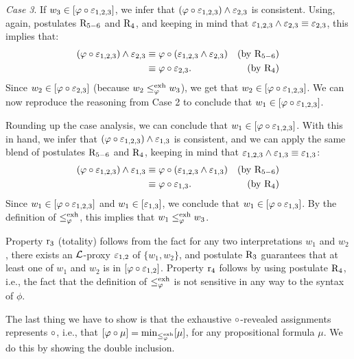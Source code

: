 \begin{prf*}{}{}
	\emph{Case 3}. If $w_3\in[\varphi\circ\varepsilon_{1,2,3}]$,
	we infer that $(\varphi\circ\varepsilon_{1,2,3})\land\varepsilon_{2,3}$ is consistent.	
	Using, again, postulates $\mathrm{R}_{5-6}$ and $\mathrm{R}_{4}$,
	and keeping in mind that $\varepsilon_{1,2,3}\land\varepsilon_{2,3}\equiv\varepsilon_{2,3}$,
	this implies that:
	\begin{align*}
		(\varphi\circ\varepsilon_{1,2,3})\land\varepsilon_{2,3} &\equiv\varphi\circ(\varepsilon_{1,2,3}\land\varepsilon_{2,3}) &(\text{by}~\mathrm{R}_{5-6})\\
		 										     &\equiv\varphi\circ\varepsilon_{2,3}. 		                 &(\text{by}~\mathrm{R}_{4})
	\end{align*}
	Since $w_2\in[\varphi\circ\varepsilon_{2,3}]$ (because $w_2\le^{\operatorname{exh}}_\varphi w_3$),
	we get that $w_2\in[\varphi\circ\varepsilon_{1,2,3}]$.
	We can now reproduce the reasoning from Case 2 to conclude that $w_1\in[\varphi\circ\varepsilon_{1,2,3}]$.
	
	Rounding up the case analysis, we can conclude that $w_1\in[\varphi\circ\varepsilon_{1,2,3}]$.
	With this in hand, we infer that $(\varphi\circ\varepsilon_{1,2,3})\land\varepsilon_{1,3}$ is consistent, 
	and we can apply the same blend of postulates $\mathrm{R}_{5-6}$ and $\mathrm{R}_{4}$,
	keeping in mind that $\varepsilon_{1,2,3}\land\varepsilon_{1,3}\equiv\varepsilon_{1,3}$:
	\begin{align*}
		(\varphi\circ\varepsilon_{1,2,3})\land\varepsilon_{1,3} &\equiv\varphi\circ(\varepsilon_{1,2,3}\land\varepsilon_{1,3}) &(\text{by}~\mathrm{R}_{5-6})\\
		 										     &\equiv\varphi\circ\varepsilon_{1,3}. 		                 &(\text{by}~\mathrm{R}_{4})
	\end{align*}
	Since $w_1\in[\varphi\circ\varepsilon_{1,2,3}]$ and $w_1\in[\varepsilon_{1,3}]$,
	we conclude that $w_1\in[\varphi\circ\varepsilon_{1,3}]$.
	By the definition of $\le^{\operatorname{exh}}_\varphi$, this implies that $w_1\le^{\operatorname{exh}}_\varphi w_3$.
	
	Property $\mathrm{r}_{3}$ (totality) follows from the fact for any two interpretations $w_1$ and $w_2$,
	there exists an $\mathcal{L}$-proxy $\varepsilon_{1,2}$ of $\{w_1,w_2\}$,
	and postulate $\mathrm{R}_{3}$ guarantees that at least one of $w_1$ and $w_2$ is in $[\varphi\circ\varepsilon_{1,2}]$.
	Property $\mathrm{r}_{4}$ follows by using postulate $\mathrm{R}_{4}$, i.e., 
	the fact that the definition of $\le^{{\operatorname{exh}}}_\varphi$ 
	is not sensitive in any way to the syntax of $\phi$.
	
	The last thing we have to show is that 
	the exhaustive $\circ$-revealed assignments represents $\circ$,
	i.e., that $[\varphi\circ\mu]={\operatorname{min}}_{\le^{\operatorname{exh}}_\varphi}[\mu]$, for any propositional formula $\mu$.
	We do this by showing the double inclusion. 
	

\end{prf*}
